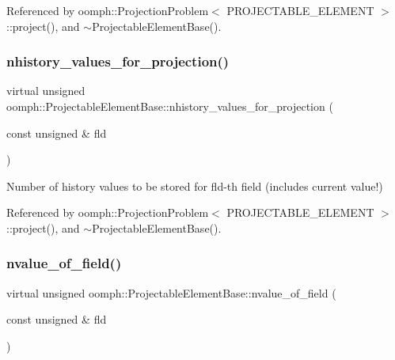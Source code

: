 Referenced by oomph\+::\+Projection\+Problem$<$ P\+R\+O\+J\+E\+C\+T\+A\+B\+L\+E\+\_\+\+E\+L\+E\+M\+E\+N\+T $>$\+::project(), and $\sim$\+Projectable\+Element\+Base().

\mbox{\label{classoomph_1_1ProjectableElementBase_ac6790f394630b964663281f8740f43a5}} 
\subsubsection{\texorpdfstring{nhistory\+\_\+values\+\_\+for\+\_\+projection()}{nhistory\_values\_for\_projection()}}
{\footnotesize\ttfamily virtual unsigned oomph\+::\+Projectable\+Element\+Base\+::nhistory\+\_\+values\+\_\+for\+\_\+projection (\begin{DoxyParamCaption}\item[{const unsigned \&}]{fld }\end{DoxyParamCaption})\hspace{0.3cm}{\ttfamily [pure virtual]}}



Number of history values to be stored for fld-\/th field (includes current value!) 



Referenced by oomph\+::\+Projection\+Problem$<$ P\+R\+O\+J\+E\+C\+T\+A\+B\+L\+E\+\_\+\+E\+L\+E\+M\+E\+N\+T $>$\+::project(), and $\sim$\+Projectable\+Element\+Base().

\mbox{\label{classoomph_1_1ProjectableElementBase_a1a9a6de16f3511bca8e8be770abb9c2e}} 
\subsubsection{\texorpdfstring{nvalue\+\_\+of\+\_\+field()}{nvalue\_of\_field()}}
{\footnotesize\ttfamily virtual unsigned oomph\+::\+Projectable\+Element\+Base\+::nvalue\+\_\+of\+\_\+field (\begin{DoxyParamCaption}\item[{const unsigned \&}]{fld }\end{DoxyParamCaption})\hspace{0.3cm}{\ttfamily [pure virtual]}}



